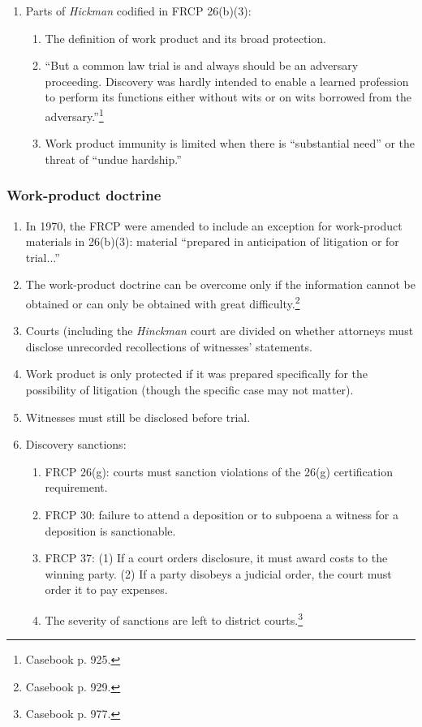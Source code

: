 \begin{enumerate}
    \item Parts of \emph{Hickman} codified in FRCP 26(b)(3):
    \begin{enumerate}
        \item The definition of work product and its broad protection.
        \item ``But a common law trial is and always should be an adversary proceeding. Discovery was hardly intended to enable a learned profession to perform its functions either without wits or on wits borrowed from the adversary.''\footnote{Casebook p. 925.}
        \item Work product immunity is limited when there is ``substantial need'' or the threat of ``undue hardship.''
    \end{enumerate}
\end{enumerate}

\subsubsection{Work-product doctrine}

\begin{enumerate}
    \item In 1970, the FRCP were amended to include an exception for work-product materials in 26(b)(3): material ``prepared in anticipation of litigation or for trial...''
    \item The work-product doctrine can be overcome only if the information cannot be obtained or can only be obtained with great difficulty.\footnote{Casebook p. 929.}
    \item Courts (including the \emph{Hinckman} court are divided on whether attorneys must disclose unrecorded recollections of witnesses' statements.
    \item Work product is only protected if it was prepared specifically for the possibility of litigation (though the specific case may not matter).
    \item Witnesses must still be disclosed before trial.
    \item Discovery sanctions:
    \begin{enumerate}
        \item FRCP 26(g): courts must sanction violations of the 26(g) certification requirement.
        \item FRCP 30: failure to attend a deposition or to subpoena a witness for a deposition is sanctionable.
        \item FRCP 37: (1) If a court orders disclosure, it must award costs to the winning party. (2) If a party disobeys a judicial order, the court must order it to pay expenses.
        \item The severity of sanctions are left to district courts.\footnote{Casebook p. 977.}
    \end{enumerate}
\end{enumerate}


